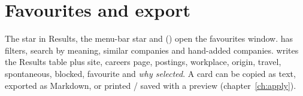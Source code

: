 \section{Favourites and export}
The star in Results, the menu-bar star and  () open the favourites window.
 has filters, search by meaning, similar companies and hand-added companies. 
writes the Results table plus site, careers page, postings, workplace, origin, travel, spontaneous, blocked, favourite
and \emph{why selected}. A card can be copied as text, exported as Markdown, or printed / saved with a preview
(chapter~\ref{ch:apply}).
